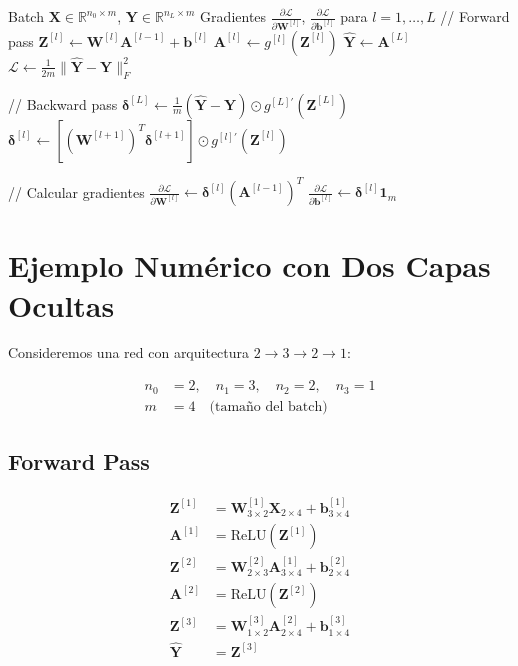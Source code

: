 \documentclass[12pt]{article}
\begin{document}
\begin{algorithmic}
\Require Batch $\mathbf{X} \in \mathbb{R}^{n_0 \times m}$, $\mathbf{Y} \in \mathbb{R}^{n_L \times m}$
\Ensure Gradientes $\frac{\partial \mathcal{L}}{\partial \mathbf{W}^{[l]}}$, $\frac{\partial \mathcal{L}}{\partial \mathbf{b}^{[l]}}$ para $l = 1, \dots, L$
\State // Forward pass
    \State $\mathbf{Z}^{[l]} \gets \mathbf{W}^{[l]} \mathbf{A}^{[l-1]} + \mathbf{b}^{[l]}$
    \State $\mathbf{A}^{[l]} \gets g^{[l]}(\mathbf{Z}^{[l]})$
\EndFor
\State $\hat{\mathbf{Y}} \gets \mathbf{A}^{[L]}$
\State $\mathcal{L} \gets \frac{1}{2m} \|\hat{\mathbf{Y}} - \mathbf{Y}\|_F^2$

\State // Backward pass
\State $\boldsymbol{\delta}^{[L]} \gets \frac{1}{m} (\hat{\mathbf{Y}} - \mathbf{Y}) \odot g^{[L]'}(\mathbf{Z}^{[L]})$
    \State $\boldsymbol{\delta}^{[l]} \gets \left[(\mathbf{W}^{[l+1]})^T \boldsymbol{\delta}^{[l+1]}\right] \odot g^{[l]'}(\mathbf{Z}^{[l]})$
\EndFor

\State // Calcular gradientes
    \State $\frac{\partial \mathcal{L}}{\partial \mathbf{W}^{[l]}} \gets \boldsymbol{\delta}^{[l]} (\mathbf{A}^{[l-1]})^T$
    \State $\frac{\partial \mathcal{L}}{\partial \mathbf{b}^{[l]}} \gets \boldsymbol{\delta}^{[l]} \mathbf{1}_m$
\EndFor
\end{algorithmic}

\section{Ejemplo Numérico con Dos Capas Ocultas}

Consideremos una red con arquitectura $2 \to 3 \to 2 \to 1$:

\begin{align}
n_0 &= 2, \quad n_1 = 3, \quad n_2 = 2, \quad n_3 = 1 \\
m &= 4 \quad \text{(tamaño del batch)}
\end{align}

\subsection{Forward Pass}

\begin{align}
\mathbf{Z}^{[1]} &= \mathbf{W}^{[1]}_{3 \times 2} \mathbf{X}_{2 \times 4} + \mathbf{b}^{[1]}_{3 \times 4} \\
\mathbf{A}^{[1]} &= \text{ReLU}(\mathbf{Z}^{[1]}) \\
\mathbf{Z}^{[2]} &= \mathbf{W}^{[2]}_{2 \times 3} \mathbf{A}^{[1]}_{3 \times 4} + \mathbf{b}^{[2]}_{2 \times 4} \\
\mathbf{A}^{[2]} &= \text{ReLU}(\mathbf{Z}^{[2]}) \\
\mathbf{Z}^{[3]} &= \mathbf{W}^{[3]}_{1 \times 2} \mathbf{A}^{[2]}_{2 \times 4} + \mathbf{b}^{[3]}_{1 \times 4} \\
\hat{\mathbf{Y}} &= \mathbf{Z}^{[3]}
\end{align}
\end{document}
